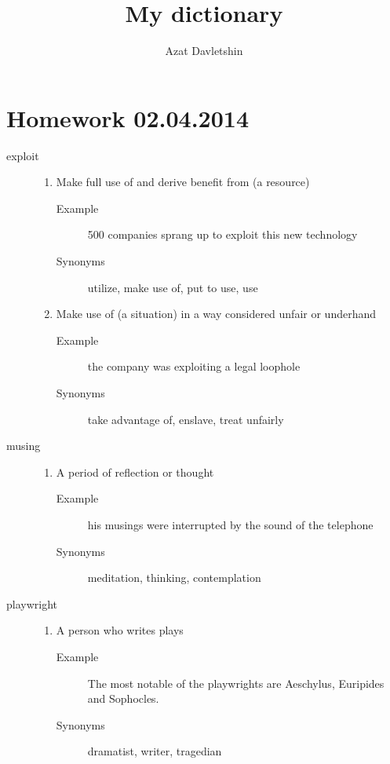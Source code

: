 \documentclass[12pt]{article}
\title{My dictionary}
\author{Azat Davletshin}
\begin{document}
\maketitle
\section{Homework 02.04.2014}
\begin{description}
\item[exploit]
	\begin{enumerate}
	\item Make full use of and derive benefit from (a resource)
		\begin{description}
		\item[Example] 500 companies sprang up to exploit this new technology
		\item[Synonyms] utilize, make use of, put to use, use
		\end{description}
	\item Make use of (a situation) in a way considered unfair or underhand
		\begin{description}
		\item[Example] the company was exploiting a legal loophole
		\item[Synonyms] take advantage of, enslave, treat unfairly
		\end{description}
	\end{enumerate}
\item[musing]
	\begin{enumerate}
	\item A period of reflection or thought
		\begin{description}
		\item[Example] his musings were interrupted by the sound of the telephone
		\item[Synonyms] meditation, thinking, contemplation
		\end{description}
	\end{enumerate}
\item[playwright]
	\begin{enumerate}
	\item A person who writes plays
		\begin{description}
		\item[Example] The most notable of the playwrights are Aeschylus, Euripides and Sophocles.
		\item[Synonyms] dramatist, writer, tragedian
		\end{description}
	\end{enumerate}

\end{description}
\end{document}
